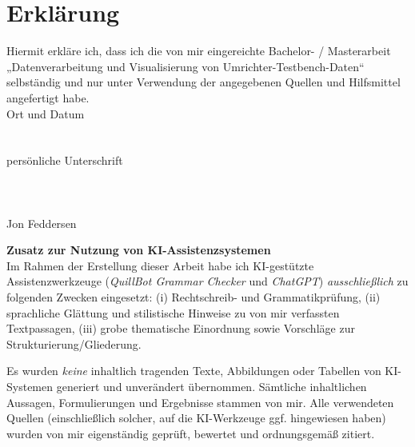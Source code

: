 \newpage
\section{Erklärung}
\label{sec:erklarung}
\label{sec:erklärung}

Hiermit erkläre ich, dass ich die von mir eingereichte Bachelor- / Masterarbeit
„Datenverarbeitung und Visualisierung von Umrichter-Testbench-Daten“ selbständig und nur unter Verwendung der
angegebenen Quellen und Hilfsmittel angefertigt habe.
\\
Ort und Datum
\\
\\
\\
persönliche Unterschrift
\\
\\
\\
\\
Jon Feddersen


\medskip
\noindent\textbf{Zusatz zur Nutzung von KI-Assistenzsystemen}\\
Im Rahmen der Erstellung dieser Arbeit habe ich KI-gestützte Assistenzwerkzeuge
(\emph{QuillBot Grammar Checker} und \emph{ChatGPT})
\emph{ausschließlich} zu folgenden Zwecken eingesetzt:
(i) Rechtschreib- und Grammatikprüfung,
(ii) sprachliche Glättung und stilistische Hinweise zu von mir verfassten Textpassagen,
(iii) grobe thematische Einordnung sowie Vorschläge zur Strukturierung/Gliederung.

Es wurden \emph{keine} inhaltlich tragenden Texte, Abbildungen oder Tabellen von KI-Systemen generiert und unverändert übernommen. Sämtliche inhaltlichen Aussagen, Formulierungen und Ergebnisse stammen von mir.
Alle verwendeten Quellen (einschließlich solcher, auf die KI-Werkzeuge ggf. hingewiesen haben) wurden von mir eigenständig geprüft, bewertet und ordnungsgemäß zitiert.
